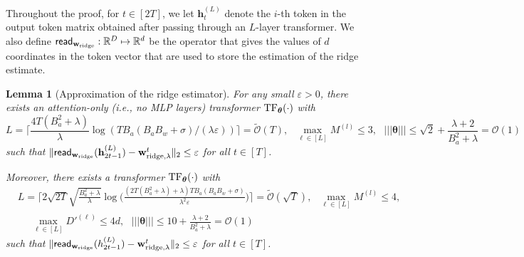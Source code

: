 \documentclass[10pt]{article}
\newtheorem{lemma}[theorem]{Lemma}
\newtheorem{corollary}[theorem]{Corollary}
\newcommand{\eps}{\varepsilon}
\renewcommand{\bR}{\mathbf{R}}
\renewcommand{\cO}{\mathcal{O}}
\newcommand{\<}{\left\langle}
\renewcommand{\>}{\right\rangle}
\newcommand{\lth}{{(\ell)}}
\newcommand{\TF}{{\rm TF}}
\newcommand{\DTF}{{\rm DTF}}
\renewcommand{\read}{{\sf read}}
\newcommand{\ridge}{{\rm ridge}}
\newcommand{\nrmp}[1]{{\left|\!\left|\!\left|{#1}\right|\!\right|\!\right|}}
\newcommand{\R}{\mathbb{R}}
\newcommand{\tcO}{{\tilde{\mathcal O}}}
\newcommand{\totlen}{{T}} %
\newcommand{\hidden}{{D'}}
\def\btheta{{\boldsymbol \theta}}
\def\bh{{\mathbf h}}
\def\bw{{\mathbf w}}
\begin{document}


Throughout the proof, for $t\in[2\totlen]$,  we let $\bh_{t}^{(L)}$ denote the $i$-th token in the output token matrix obtained after passing through an $L$-layer transformer. We also define  $\read_{\bw_\ridge}: \R^{D}\mapsto\R^{d}$ be the operator that gives the values of  $d$ coordinates  in the token vector that are used to store the estimation of  the ridge estimate.


\begin{lemma}[Approximation of the ridge estimator]\label{lm:approx_ridge}
For any small $\eps>0$, there exists an attention-only (i.e., no MLP layers) transformer $\TF_\btheta(\cdot)$ with 
$$L=\Big\lceil\frac{4T(B_a^2+\lambda)}{\lambda}\log({TB_a(B_aB_w+\sigma)}/({\lambda}\eps))\Big\rceil=\tcO(T),~~~\max_{\ell\in[L]}M^{(l)}\leq3,~~~ \nrmp{\btheta}\leq  \sqrt{2}+\frac{\lambda+2}{B_a^2+\lambda}=\cO(1)$$ such that $\|\read_{\bw_{\ridge}}(\bh_{2t-1}^{(L)})-\bw^t_{\ridge,\lambda}\|_2\leq\eps$ for all $t\in[T]$. 

Moreover, there exists a  transformer $\TF_\btheta(\cdot)$ with  \begin{align*}&L=\Big\lceil2\sqrt{2T}\sqrt{\frac{B_a^2+\lambda}{\lambda}}\log\Big(\frac{(2T(B_a^2+\lambda)+\lambda)TB_a(B_aB_w+\sigma)}{\lambda^2\eps}\Big)\Big\rceil=\tcO(\sqrt{T}),~~~\max_{\ell\in[L]}M^{(l)}\leq4,~~~ \\
&~~~~~~\max_{\ell\in[L]}\hidden^{\lth}\leq 4d,~~~\nrmp{\btheta}\leq  10+\frac{\lambda+2}{B_a^2+\lambda}=\cO(1) \end{align*}
 such that $\|\read_{\bw_{\ridge}}(h_{2t-1}^{(L)})-\bw^t_{\ridge,\lambda}\|_2\leq\eps$ for all $t\in[T]$. 
\end{lemma}
\end{document}
